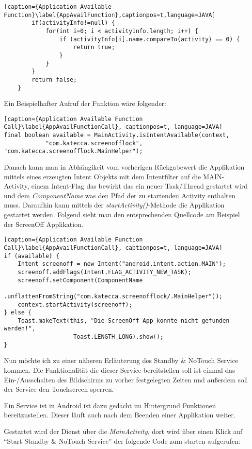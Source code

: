 \begin{flushleft}
\begin{lstlisting}[caption={Application Available Function}\label{AppAvailFunction},captionpos=t,language=JAVA]
		if(activityInfo!=null) {
            for(int i=0; i < activityInfo.length; i++) {
            	if (activityInfo[i].name.compareTo(activity) == 0) {
            		return true;
            	}
            }
        }
		return false;
	}
\end{lstlisting}

Ein Beispielhafter Aufruf der Funktion wäre folgender:

\begin{lstlisting}[caption={Application Available Function Call}\label{AppAvailFunctionCall}, captionpos=t, language=JAVA] 
final boolean available = MainActivity.isIntentAvailable(context,
			"com.katecca.screenofflock", "com.katecca.screenofflock.MainHelper");
\end{lstlisting}

Danach kann man in Abhängikeit vom vorherigen Rückgabewert die Applikation mittels eines erzeugten Intent Objekts mit dem Intentfilter auf die MAIN-Activity, einem Intent-Flag das bewirkt das ein neuer Task/Thread gestartet wird und dem \textit{ComponentName} was den Pfad der zu startenden Activity enthalten muss.
\newpage
Daraufhin kann mittels der \textit{startActivity()}-Methode die Applikation gestartet werden. Folgend sieht man den entsprechenden Quellcode am Beispiel der ScreenOff Applikation.
\begin{lstlisting}[caption={Application Available Function Call}\label{AppAvailFunctionCall}, captionpos=t, language=JAVA] 
if (available) {
	Intent screenoff = new Intent("android.intent.action.MAIN");
	screenoff.addFlags(Intent.FLAG_ACTIVITY_NEW_TASK);
	screenoff.setComponent(ComponentName
				.unflattenFromString("com.katecca.screenofflock/.MainHelper"));
	context.startActivity(screenoff);
} else {
	Toast.makeText(this, "Die ScreenOff App konnte nicht gefunden werden!",
					Toast.LENGTH_LONG).show();
}
\end{lstlisting}
\vspace{1cm} \hspace{1cm}
Nun möchte ich zu einer näheren Erläuterung des Standby \& NoTouch Service kommen. Die Funktionalität die dieser Service bereitstellen soll ist einmal das Ein-/Ausschalten des Bildschirms zu vorher festgelegten Zeiten und außerdem soll der Service den Touchscreen sperren.

Ein Service ist in Android ist dazu gedacht im Hintergrund Funktionen bereitzustellen. Dieser läuft auch nach dem Beenden einer Applikation weiter.

Gestartet wird der Dienst über die \textit{MainActivity}, dort wird über einen Klick auf ``Start Standby \& NoTouch Service'' der folgende Code zum starten aufgerufen:


\end{flushleft}
